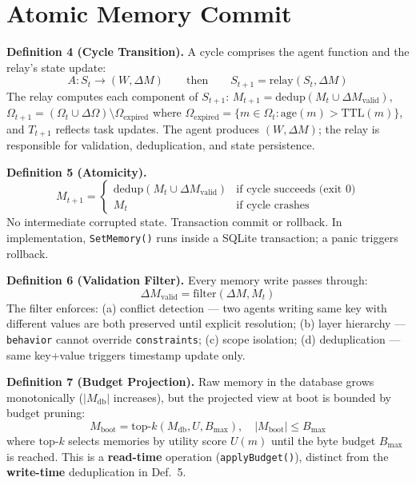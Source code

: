 \documentclass{article}
\begin{document}
\clearpage
\section{Atomic Memory Commit}

\textbf{Definition 4 (Cycle Transition).} A cycle comprises the agent function and the relay's state update:
$$A : S_t \rightarrow (W, \Delta M) \qquad \text{then} \qquad S_{t+1} = \text{relay}(S_t, \Delta M)$$
The relay computes each component of $S_{t+1}$: $M_{t+1} = \text{dedup}(M_t \cup \Delta M_{\text{valid}})$, $\Omega_{t+1} = (\Omega_t \cup \Delta\Omega) \setminus \Omega_{\text{expired}}$ where $\Omega_{\text{expired}} = \{m \in \Omega_t : \text{age}(m) > \text{TTL}(m)\}$, and $T_{t+1}$ reflects task updates. The agent produces $(W, \Delta M)$; the relay is responsible for validation, deduplication, and state persistence.

\textbf{Definition 5 (Atomicity).}
$$M_{t+1} = \begin{cases} \text{dedup}(M_t \cup \Delta M_{\text{valid}}) & \text{if cycle succeeds (exit 0)} \\ M_t & \text{if cycle crashes} \end{cases}$$
No intermediate corrupted state. Transaction commit or rollback. In implementation, \texttt{SetMemory()} runs inside a SQLite transaction; a panic triggers rollback.

\textbf{Definition 6 (Validation Filter).} Every memory write passes through:
$$\Delta M_{\text{valid}} = \text{filter}(\Delta M, M_t)$$
The filter enforces: (a) conflict detection --- two agents writing same key with different values are both preserved until explicit resolution; (b) layer hierarchy --- \texttt{behavior} cannot override \texttt{constraints}; (c) scope isolation; (d) deduplication --- same key+value triggers timestamp update only.

\textbf{Definition 7 (Budget Projection).} Raw memory in the database grows monotonically ($|M_{\text{db}}|$ increases), but the projected view at boot is bounded by budget pruning:
$$M_{\text{boot}} = \text{top-}k(M_{\text{db}}, U, B_{\max}), \quad |M_{\text{boot}}| \leq B_{\max}$$
where $\text{top-}k$ selects memories by utility score $U(m)$ until the byte budget $B_{\max}$ is reached. This is a \textbf{read-time} operation (\texttt{applyBudget()}), distinct from the \textbf{write-time} deduplication in Def.~5.
\end{document}
